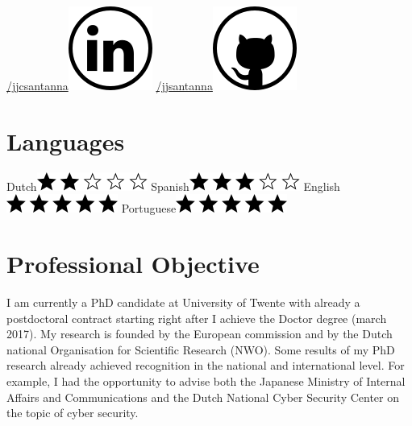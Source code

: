 \documentclass[print]{styles/friggeri-cv-mac} %
\begin{document}
\begin{aside}
\href{https://www.linkedin.com/in/jjcsantanna}{/jjcsantanna}\includegraphics[scale=0.3]{img/linkedin.png}
\href{https://github.com/jjsantanna}{/jjsantanna\includegraphics[scale=0.3]{img/github.png}}
~
\section{Languages}
Dutch\includegraphics[scale=0.40]{img/2stars.png}
Spanish\includegraphics[scale=0.40]{img/3stars.png}
English\includegraphics[scale=0.40]{img/5stars.png}
Portuguese\includegraphics[scale=0.40]{img/5stars.png}
\end{aside}

\section{Professional Objective}\vspace{-10pt}
\setlength\parindent{12pt}I am currently a PhD candidate at University of
Twente with already a postdoctoral contract starting right after I achieve the
Doctor degree (march 2017). My research is founded by the European commission
and by the Dutch national Organisation for Scientific Research (NWO). Some
results of my PhD research already achieved recognition in the national and
international level. For example, I had the opportunity to advise both the
Japanese Ministry of Internal Affairs and Communications and the Dutch National
Cyber Security Center on the topic of cyber security. 
\end{document}
